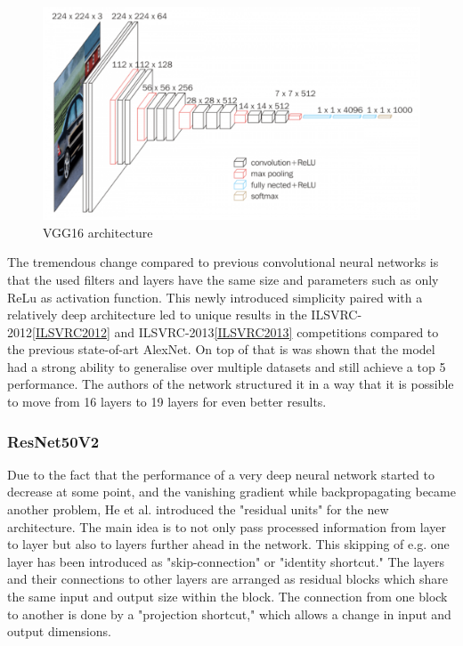 \begin{figure}[ht]
  \centering
  \includegraphics[width=\linewidth]{figures/vgg16.png}
  \caption{VGG16 architecture\cite{simonyan2015deep}}
  \label{fig:vgg16}
\end{figure}

The tremendous change compared to previous convolutional neural networks is that the used filters and layers have the same size and parameters such as only ReLu as activation function\cite{simonyan2015deep}. This newly introduced simplicity paired with a relatively deep architecture led to unique results in the ILSVRC-2012\ref{ILSVRC2012} and ILSVRC-2013\ref{ILSVRC2013} competitions compared to the previous state-of-art AlexNet. On top of that is was shown that the model had a strong ability to generalise over multiple datasets and still achieve a top 5 performance. The authors of the network structured it in a way that it is possible to move from 16 layers to 19 layers for even better results.

\subsubsection{ResNet50V2}\label{resnet}
Due to the fact that the performance of a very deep neural network started to decrease at some point, and the vanishing gradient while backpropagating became another problem, He et al. introduced the "residual units" for the new architecture\cite{he2015deep}. The main idea is to not only pass processed information from layer to layer but also to layers further ahead in the network. This skipping of e.g. one layer has been introduced as "skip-connection" or "identity shortcut." The layers and their connections to other layers are arranged as residual blocks which share the same input and output size within the block\cite{he2015deep}. The connection from one block to another is done by a "projection shortcut," which allows a change in input and output dimensions.

